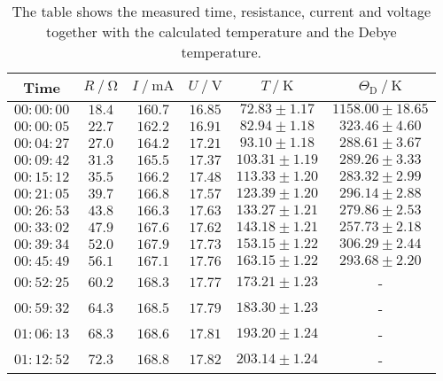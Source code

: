 \begin{table}[H]
    \centering
    \caption{The table shows the measured time, resistance, current and voltage together with the calculated temperature and the Debye temperature.}
    \label{tab:data}
    \begin{tabular}{c c c c c c}
    \toprule
      {Time} & $R \mathbin{/} \unit{\ohm}$ & $I \mathbin{/} \unit{\milli\ampere}$&$U \mathbin{/} \unit{\volt} $& $T \mathbin{/} \unit{\kelvin}$&$\Theta_\text{D} \mathbin{/} \unit{\kelvin}$ \\
    \midrule
          $00:00:00$  &  $18.4$ &    $160.7$ &   $ 16.85$  & $72.83  \pm 1.17$&    $1158.00\pm 18.65$   \\    
          $00:00:05$  &  $22.7$ &    $162.2$ &   $ 16.91$  & $82.94  \pm 1.18$&    $323.46 \pm 4.60$   \\    
          $00:04:27$  &  $27.0$ &    $164.2$ &   $ 17.21$  & $93.10  \pm 1.18$&    $288.61 \pm 3.67$   \\    
          $00:09:42$  &  $31.3$ &    $165.5$ &   $ 17.37$  & $103.31 \pm 1.19$&    $289.26 \pm 3.33$   \\    
          $00:15:12$  &  $35.5$ &    $166.2$ &   $ 17.48$  & $113.33 \pm 1.20$&    $283.32 \pm 2.99$   \\    
          $00:21:05$  &  $39.7$ &    $166.8$ &   $ 17.57$  & $123.39 \pm 1.20$&    $296.14 \pm 2.88$   \\    
          $00:26:53$  &  $43.8$ &    $166.3$ &   $ 17.63$  & $133.27 \pm 1.21$&    $279.86 \pm 2.53$   \\    
          $00:33:02$  &  $47.9$ &    $167.6$ &   $ 17.62$  & $143.18 \pm 1.21$&    $257.73 \pm 2.18$   \\    
          $00:39:34$  &  $52.0$ &    $167.9$ &   $ 17.73$  & $153.15 \pm 1.22$&    $306.29 \pm 2.44$   \\    
          $00:45:49$  &  $56.1$ &    $167.1$ &   $ 17.76$  & $163.15 \pm 1.22$&    $293.68 \pm 2.20$   \\    
          $00:52:25$  &  $60.2$ &    $168.3$ &   $ 17.77$  & $173.21 \pm 1.23$&-                       \\    
          $00:59:32$  &  $64.3$ &    $168.5$ &   $ 17.79$  & $183.30 \pm 1.23$&-                       \\    
          $01:06:13$  &  $68.3$ &    $168.6$ &   $ 17.81$  & $193.20 \pm 1.24$&-                       \\    
          $01:12:52$  &  $72.3$ &    $168.8$ &   $ 17.82$  & $203.14 \pm 1.24$&-                       \\    

\end{tabular}
\end{table}
